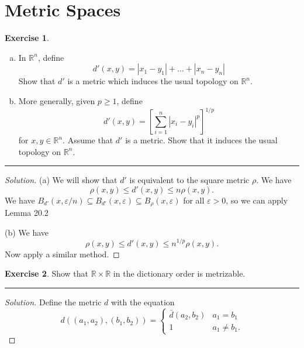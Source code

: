 \documentclass{article}
\theoremstyle{definition}
\newtheorem{exercise}{Exercise}[section]
\begin{document}
\addtocounter{section}{19}
\section{Metric Spaces}

\begin{exercise}
  \begin{enumerate}[(a)]
    \item In $\mathbb{R}^n$, define
    $$d'(x,y) = |x_1 - y_1| + \dots + |x_n - y_n|$$
    Show that $d'$ is a metric which induces the usual topology on $\mathbb{R}^n$.
    \item More generally, given $p\ge 1$, define
    $$d'(x,y) = \left[\sum_{i=1}^n |x_i-y_i|^p\right]^{1/p}$$
    for $x,y\in\mathbb{R}^n$. Assume that $d'$ is a metric. Show that it induces the usual topology on $\mathbb{R}^n$.
  \end{enumerate}
\end{exercise}\hrule
\begin{proof}[Solution]
  (a) We will show that $d'$ is equivalent to the square metric $\rho$. We have
  $$\rho(x,y)\le d'(x,y)\le n\rho(x,y).$$
  We have $B_{d'}(x,\varepsilon/n)\subseteq B_{d'}(x,\varepsilon)\subseteq B_\rho(x,\varepsilon)$ for all $\varepsilon > 0$, so we can apply Lemma 20.2

  (b) We have
  $$\rho(x,y)\le d'(x,y)\le n^{1/p}\rho(x,y).$$
  Now apply a similar method.
\end{proof}

\pagebreak

\begin{exercise}
  Show that $\mathbb{R}\times\mathbb{R}$ in the dictionary order is metrizable.
\end{exercise}\hrule
\begin{proof}[Solution]
  Define the metric $d$ with the equation
  $$d((a_1,a_2), (b_1,b_2)) = \begin{cases}
    \bar{d}(a_2,b_2) & a_1 = b_1 \\
    1 & a_1 \ne b_1.
  \end{cases}$$

\end{proof}

\pagebreak
\end{document}
